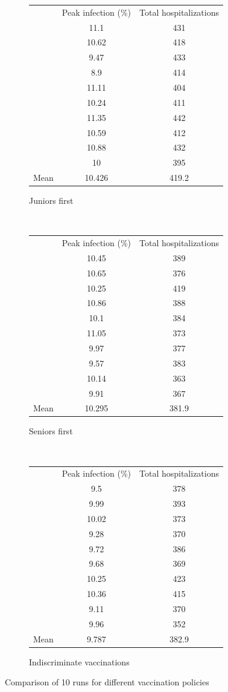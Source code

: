 \documentclass{article}
\begin{document}
\begin{figure}[h!]
\centering
\begin{subfigure}[b]{0.5\textwidth}
\centering
\begin{tabular}{rc|c}
& Peak infection (\%) & Total hospitalizations\\ \cline{2-3}
& 11.1  & 431\\
& 10.62 & 418\\
& 9.47  & 433\\
& 8.9   & 414\\
& 11.11 & 404\\
& 10.24 & 411\\
& 11.35 & 442\\
& 10.59 & 412\\
& 10.88 & 432\\
& 10    & 395\\ \hline
Mean & 10.426 & 419.2
\end{tabular}
\caption{Juniors first}
\end{subfigure}~
\begin{subfigure}[b]{0.5\textwidth}
\centering
\begin{tabular}{rc|c}
& Peak infection (\%) & Total hospitalizations\\ \cline{2-3}
& 10.45 & 389\\
& 10.65 & 376\\
& 10.25 & 419\\
& 10.86 & 388\\
& 10.1  & 384\\
& 11.05 & 373\\
& 9.97  & 377\\
& 9.57  & 383\\
& 10.14 & 363\\
& 9.91  & 367\\ \hline
Mean & 10.295 & 381.9
\end{tabular}
\caption{Seniors first}
\end{subfigure}\\
\begin{subfigure}[b]{0.5\textwidth}
\centering
\begin{tabular}{rc|c}
& Peak infection (\%) & Total hospitalizations\\ \cline{2-3}
& 9.5   & 378\\
& 9.99  & 393\\
& 10.02 & 373\\
& 9.28  & 370\\
& 9.72  & 386\\
& 9.68  & 369\\
& 10.25 & 423\\
& 10.36 & 415\\
& 9.11  & 370\\
& 9.96  & 352\\ \hline
Mean & 9.787 & 382.9
\end{tabular}
\caption{Indiscriminate vaccinations}
\end{subfigure}
\caption{Comparison of 10 runs for different vaccination policies}
\label{fig:10outs}
\end{figure}
\end{document}
